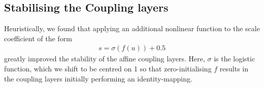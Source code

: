 \subsection{Stabilising the Coupling layers}\label{sec:those-darn-coupling-layers}
\noindent Heuristically, we found that  applying an additional nonlinear function to the scale coefficient of the form
\begin{align}
  s = \sigma (f(u)) + 0.5
  \label{eq:heuristic-1}
\end{align}
greatly improved the stability of the affine coupling layers. Here, $\sigma$ is the logistic function, which we shift to be centred on 1 so that zero-initialising $f$ results in the coupling layers initially performing an identity-mapping.

\begin{figure}[tb]
  \centering
\end{figure}
